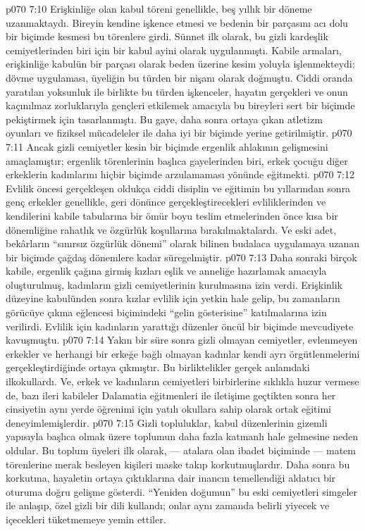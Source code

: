 \vs p070 7:10 Erişkinliğe olan kabul töreni genellikle, beş yıllık bir döneme uzanmaktaydı. Bireyin kendine işkence etmesi ve bedenin bir parçasını acı dolu bir biçimde kesmesi bu törenlere girdi. Sünnet ilk olarak, bu gizli kardeşlik cemiyetlerinden biri için bir kabul ayini olarak uygulanmıştı. Kabile armaları, erişkinliğe kabulün bir parçası olarak beden üzerine kesim yoluyla işlenmekteydi; dövme uygulaması, üyeliğin bu türden bir nişanı olarak doğmuştu. Ciddi oranda yaratılan yoksunluk ile birlikte bu türden işkenceler, hayatın gerçekleri ve onun kaçınılmaz zorluklarıyla gençleri etkilemek amacıyla bu bireyleri sert bir biçimde pekiştirmek için tasarlanmıştı. Bu gaye, daha sonra ortaya çıkan atletizm oyunları ve fiziksel mücadeleler ile daha iyi bir biçimde yerine getirilmiştir.
\vs p070 7:11 Ancak gizli cemiyetler kesin bir biçimde ergenlik ahlakının gelişmesini amaçlamıştır; ergenlik törenlerinin başlıca gayelerinden biri, erkek çocuğu diğer erkeklerin kadınlarını hiçbir biçimde arzulamaması yönünde eğitmekti.
\vs p070 7:12 Evlilik öncesi gerçekleşen oldukça ciddi disiplin ve eğitimin bu yıllarından sonra genç erkekler genellikle, geri dönünce gerçekleştirecekleri evliliklerinden ve kendilerini kabile tabularına bir ömür boyu teslim etmelerinden önce kısa bir dönemliğine rahatlık ve özgürlük koşullarına bırakılmaktalardı. Ve eski adet, bekârların “sınırsız özgürlük dönemi” olarak bilinen budalaca uygulamaya uzanan bir biçimde çağdaş dönemlere kadar süregelmiştir.
\vs p070 7:13 Daha sonraki birçok kabile, ergenlik çağına girmiş kızları eşlik ve anneliğe hazırlamak amacıyla oluşturulmuş, kadınların gizli cemiyetlerinin kurulmasına izin verdi. Erişkinlik düzeyine kabulünden sonra kızlar evlilik için yetkin hale gelip, bu zamanların görücüye çıkma eğlencesi biçimindeki “gelin gösterisine” katılmalarına izin verilirdi. Evlilik için kadınların yarattığı düzenler öncül bir biçimde mevcudiyete kavuşmuştu.
\vs p070 7:14 Yakın bir süre sonra gizli olmayan cemiyetler, evlenmeyen erkekler ve herhangi bir erkeğe bağlı olmayan kadınlar kendi ayrı örgütlenmelerini gerçekleştirdiğinde ortaya çıkmıştır. Bu birliktelikler gerçek anlamdaki ilkokullardı. Ve, erkek ve kadınların cemiyetleri birbirlerine sıklıkla huzur vermese de, bazı ileri kabileler Dalamatia eğitmenleri ile iletişime geçtikten sonra her cinsiyetin aynı yerde öğrenimi için yatılı okullara sahip olarak ortak eğitimi deneyimlemişlerdir.
\vs p070 7:15 Gizli topluluklar, kabul düzenlerinin gizemli yapısıyla başlıca olmak üzere toplumun daha fazla katmanlı hale gelmesine neden oldular. Bu toplum üyeleri ilk olarak, --- atalara olan ibadet biçiminde --- matem törenlerine merak besleyen kişileri maske takıp korkutmuşlardır. Daha sonra bu korkutma, hayaletin ortaya çıktıklarına dair inancın temellendiği aldatıcı bir oturuma doğru gelişme gösterdi. “Yeniden doğumun” bu eski cemiyetleri simgeler ile anlaşıp, özel gizli bir dili kullandı; onlar aynı zamanda belirli yiyecek ve içecekleri tüketmemeye yemin ettiler.
